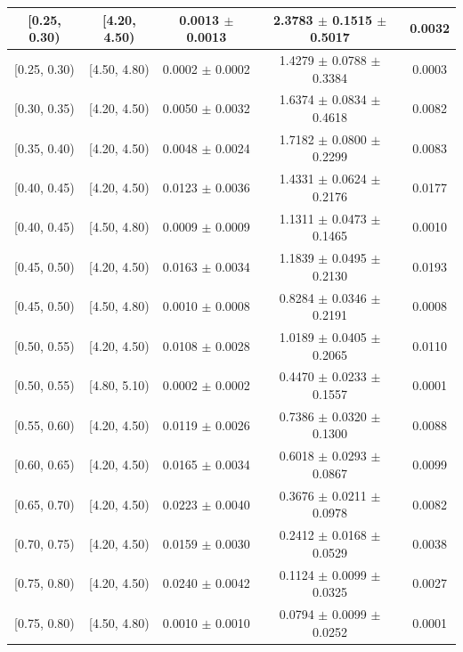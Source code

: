\begin{longtable}{|c|c|c|c|c|}
\hline
\endlastfoot
[0.25, 0.30) & [4.20, 4.50) & 0.0013 $\pm$ 0.0013 & 2.3783 $\pm$ 0.1515 $\pm$ 0.5017 & 0.0032 \\ 
\hline
[0.25, 0.30) & [4.50, 4.80) & 0.0002 $\pm$ 0.0002 & 1.4279 $\pm$ 0.0788 $\pm$ 0.3384 & 0.0003 \\ 
\hline
[0.30, 0.35) & [4.20, 4.50) & 0.0050 $\pm$ 0.0032 & 1.6374 $\pm$ 0.0834 $\pm$ 0.4618 & 0.0082 \\ 
\hline
[0.35, 0.40) & [4.20, 4.50) & 0.0048 $\pm$ 0.0024 & 1.7182 $\pm$ 0.0800 $\pm$ 0.2299 & 0.0083 \\ 
\hline
[0.40, 0.45) & [4.20, 4.50) & 0.0123 $\pm$ 0.0036 & 1.4331 $\pm$ 0.0624 $\pm$ 0.2176 & 0.0177 \\ 
\hline
[0.40, 0.45) & [4.50, 4.80) & 0.0009 $\pm$ 0.0009 & 1.1311 $\pm$ 0.0473 $\pm$ 0.1465 & 0.0010 \\ 
\hline
[0.45, 0.50) & [4.20, 4.50) & 0.0163 $\pm$ 0.0034 & 1.1839 $\pm$ 0.0495 $\pm$ 0.2130 & 0.0193 \\ 
\hline
[0.45, 0.50) & [4.50, 4.80) & 0.0010 $\pm$ 0.0008 & 0.8284 $\pm$ 0.0346 $\pm$ 0.2191 & 0.0008 \\ 
\hline
[0.50, 0.55) & [4.20, 4.50) & 0.0108 $\pm$ 0.0028 & 1.0189 $\pm$ 0.0405 $\pm$ 0.2065 & 0.0110 \\ 
\hline
[0.50, 0.55) & [4.80, 5.10) & 0.0002 $\pm$ 0.0002 & 0.4470 $\pm$ 0.0233 $\pm$ 0.1557 & 0.0001 \\ 
\hline
[0.55, 0.60) & [4.20, 4.50) & 0.0119 $\pm$ 0.0026 & 0.7386 $\pm$ 0.0320 $\pm$ 0.1300 & 0.0088 \\ 
\hline
[0.60, 0.65) & [4.20, 4.50) & 0.0165 $\pm$ 0.0034 & 0.6018 $\pm$ 0.0293 $\pm$ 0.0867 & 0.0099 \\ 
\hline
[0.65, 0.70) & [4.20, 4.50) & 0.0223 $\pm$ 0.0040 & 0.3676 $\pm$ 0.0211 $\pm$ 0.0978 & 0.0082 \\ 
\hline
[0.70, 0.75) & [4.20, 4.50) & 0.0159 $\pm$ 0.0030 & 0.2412 $\pm$ 0.0168 $\pm$ 0.0529 & 0.0038 \\ 
\hline
[0.75, 0.80) & [4.20, 4.50) & 0.0240 $\pm$ 0.0042 & 0.1124 $\pm$ 0.0099 $\pm$ 0.0325 & 0.0027 \\ 
\hline
[0.75, 0.80) & [4.50, 4.80) & 0.0010 $\pm$ 0.0010 & 0.0794 $\pm$ 0.0099 $\pm$ 0.0252 & 0.0001 \\ 
\hline
\end{longtable}
